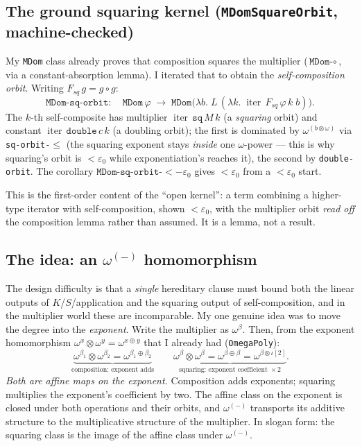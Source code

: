 \documentclass[11pt]{article}
\newcommand{\eps}{\varepsilon_0}
\newcommand{\iterop}{\operatorname{iter}}
\newcommand{\code}[1]{\texttt{#1}}
\theoremstyle{definition}
\begin{document}
\subsection{The ground squaring kernel (\code{MDomSquareOrbit}, machine-checked)}

My \code{MDom} class already proves that composition squares the
multiplier ($\code{MDom-}\!\circ$, via a constant-absorption lemma). I iterated
that to obtain the \emph{self-composition orbit}. Writing
$F_{sq}\,g = g\circ g$:
\[
  \code{MDom-sq-orbit} :\quad
  \code{MDom}\,\varphi \;\longrightarrow\;
  \code{MDom}\bigl(\lambda b.\; L\,(\lambda k.\; \iterop\,F_{sq}\,\varphi\,k\;b)\bigr).
\]
The $k$-th self-composite has multiplier $\iterop\,\code{sq}\,M\,k$ (a
\emph{squaring} orbit) and constant $\iterop\,\code{double}\,c\,k$ (a doubling
orbit); the first is dominated by $\omega^{(b\otimes\omega)}$ via
\code{sq-orbit-$\le$} (the squaring exponent stays \emph{inside}
one $\omega$-power --- this is why squaring's orbit is $<\eps$ while
exponentiation's reaches it), the second by \code{double-orbit}. The corollary
$\code{MDom-sq-orbit-}{<}{-}\eps$ gives $<\eps$ from a $<\eps$ start.

This is the first-order content of the ``open kernel'': a term combining a
higher-type iterator with self-composition, shown $<\eps$, with the multiplier
orbit \emph{read off} the composition lemma rather than assumed. It is a lemma,
not a result.

\subsection{The idea: an $\omega^{(-)}$ homomorphism}

The design difficulty is that a \emph{single} hereditary clause must bound both
the linear outputs of $K$/$S$/application and the squaring output of
self-composition, and in the multiplier world these are incomparable. My one
genuine idea was to move the degree into the \emph{exponent}. Write the
multiplier as $\omega^{\beta}$. Then, from the exponent homomorphism
$\omega^{x}\otimes\omega^{y}=\omega^{x\oplus y}$ that I already had (\code{OmegaPoly}):
\[
  \underbrace{\omega^{\beta_1}\otimes\omega^{\beta_2}=\omega^{\beta_1\oplus\beta_2}}_{\text{composition: exponent adds}}
  \qquad
  \underbrace{\omega^{\beta}\otimes\omega^{\beta}=\omega^{\beta\oplus\beta}=\omega^{\beta\otimes\iota[2]}}_{\text{squaring: exponent coefficient }\times 2}.
\]
\emph{Both are affine maps on the exponent.} Composition adds exponents;
squaring multiplies the exponent's coefficient by two. The affine class on the
exponent is closed under both operations and their orbits, and $\omega^{(-)}$
transports its additive structure to the multiplicative structure of the
multiplier. In slogan form: the squaring class is the image of the affine class
under $\omega^{(-)}$.
\end{document}
